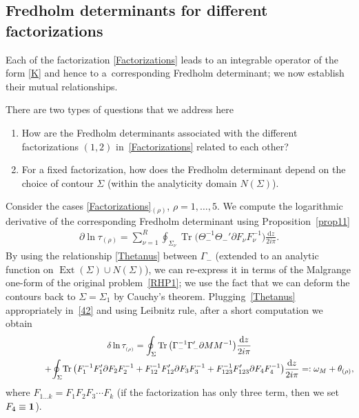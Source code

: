 \documentclass[pdftex]{sigma}
\numberwithin{equation}{section}
\def \G{\Gamma}
\def \pa{\partial}
\def\d{\mathrm d}
\def\1{{\bf 1}}
\begin{document}
\subsection{Fredholm determinants for dif\/ferent factorizations}
Each of the factorization \eqref{Factorizations} leads to an integrable operator of the form \eqref{K} and hence to a~corresponding Fredholm determinant; we now establish their mutual relationships.

There are two types of questions that we address here
\begin{enumerate}\itemsep=0pt
\item How are the Fredholm determinants associated with the dif\/ferent factorizations $(1,2)$ in~\eqref{Factorizations} related to each other?
\item For a f\/ixed factorization, how does the Fredholm determinant depend on the choice of contour $\Sigma$ (within the analyticity domain $N(\Sigma)$).
\end{enumerate}

Consider the cases \eqref{Factorizations}$_{(\rho)}$, $\rho=1,\dots, 5$.
We compute the logarithmic derivative of the corresponding Fredholm determinant using Proposition~\ref{prop11}
\begin{gather}
\pa \ln \tau_{(\rho)} = \sum_{\nu=1}^R \oint_{\Sigma_\nu} \operatorname{Tr} \big(\Theta_-^{-1} \Theta_-'\pa F_\nu F_\nu^{-1} \big) \frac {\d z}{2i\pi}.\label{42}
\end{gather}
By using the relationship \eqref{Thetanus} between $\Gamma_-$ (extended to an analytic function on $\operatorname{Ext}(\Sigma) \cup N(\Sigma)$), we can re-express it in terms of the Malgrange one-form of the original problem~\eqref{RHP1}; we use the fact that we can deform the contours back to $\Sigma = \Sigma_1$ by Cauchy's theorem. Plugging~\eqref{Thetanus} appropriately in~\eqref{42} and using Leibnitz rule, after a short computation we obtain {\samepage
\begin{gather}
\delta \ln \tau_{_{(\rho)}} = \oint_{\Sigma} \operatorname{Tr} \big(\G_-^{-1} \G_-' \pa M M^{-1} \big) \frac {\d z}{2i\pi} \label{omegarho} \\
\hphantom{\delta \ln \tau_{_{(\rho)}} =}{} +\! \oint_{\Sigma}\! \operatorname{Tr} \big( F_1^{-1} F_1 ' \pa F_2 F_2^{-1} +
 F_{12} ^{-1} F_{12}' \pa F_3 F_3^{-1} + F_{123}^{-1} F_{123}' \pa F_4 F_4^{-1} \big) \frac {\d z}{2i\pi} =:\omega_M + \theta_{(\rho)},\!\nonumber
 \end{gather}
 where $F_{1\dots k} = F_1F_2F_3\cdots F_k$ (if the factorization has only three term, then we set $F_4\equiv \1$).}
\end{document}
